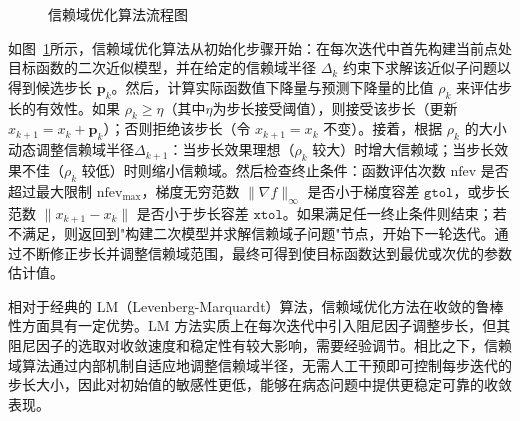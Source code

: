 \begin{figure}[htbp]
	\caption{信赖域优化算法流程图}
	\label{fig:TRO_flowchart}
\end{figure}


如图~\ref{fig:TRO_flowchart}所示，信赖域优化算法从初始化步骤开始：在每次迭代中首先构建当前点处目标函数的二次近似模型，并在给定的信赖域半径 $\Delta_k$ 约束下求解该近似子问题以得到候选步长 $\mathbf{p}_k$。然后，计算实际函数值下降量与预测下降量的比值 $\rho_k$ 来评估步长的有效性。如果 $\rho_k \ge \eta$（其中$\eta$为步长接受阈值），则接受该步长（更新 $x_{k+1} = x_k + \mathbf{p}_k$）；否则拒绝该步长（令 $x_{k+1} = x_k$ 不变）。接着，根据 $\rho_k$ 的大小动态调整信赖域半径$\Delta_{k+1}$：当步长效果理想（$\rho_k$ 较大）时增大信赖域；当步长效果不佳（$\rho_k$ 较低）时则缩小信赖域。然后检查终止条件：函数评估次数 $\mathrm{nfev}$ 是否超过最大限制 $\mathrm{nfev_{max}}$，梯度无穷范数 $\|\nabla f\|_\infty$ 是否小于梯度容差 $\texttt{gtol}$，或步长范数 $\|x_{k+1} - x_k\|$ 是否小于步长容差 $\texttt{xtol}$。如果满足任一终止条件则结束；若不满足，则返回到"构建二次模型并求解信赖域子问题"节点，开始下一轮迭代。通过不断修正步长并调整信赖域范围，最终可得到使目标函数达到最优或次优的参数估计值。


相对于经典的 LM（Levenberg-Marquardt）算法，信赖域优化方法在收敛的鲁棒性方面具有一定优势。LM 方法实质上在每次迭代中引入阻尼因子调整步长，但其阻尼因子的选取对收敛速度和稳定性有较大影响，需要经验调节。相比之下，信赖域算法通过内部机制自适应地调整信赖域半径，无需人工干预即可控制每步迭代的步长大小，因此对初始值的敏感性更低，能够在病态问题中提供更稳定可靠的收敛表现。


